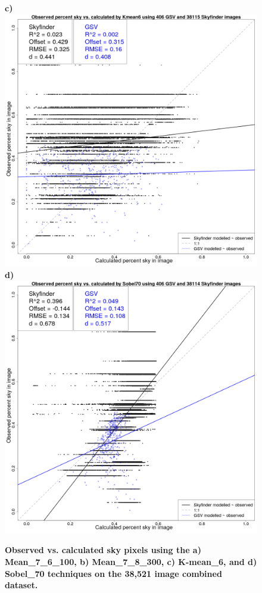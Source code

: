 \documentclass[final,3p,times,authoryear]{elsarticle}
\begin{document}
\begin{figure}
\textbf{c)}\includegraphics[scale=0.15]{Images/ErrorPlotsCombinedIndivKmean6.png}
\textbf{d)}\includegraphics[scale=0.15]{Images/ErrorPlotsCombinedIndivSobel70.png}
\caption{\textbf{Observed vs. calculated sky pixels using the a) Mean\_7\_6\_100, b) Mean\_7\_8\_300, c) K-mean\_6, and d) Sobel\_70 techniques on the 38,521 image combined dataset.} }
\label{fig:errorallcombined}
\end{figure}
\end{document}
